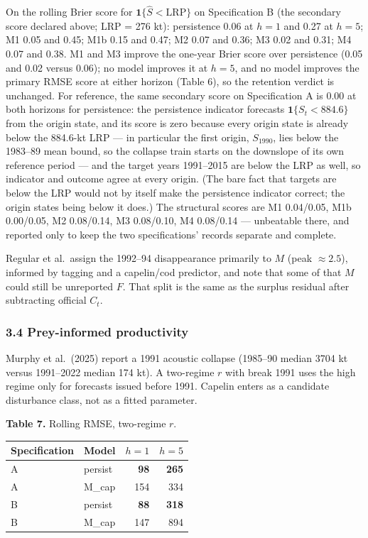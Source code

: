\documentclass[11pt]{article}
\begin{document}
On the rolling Brier score for \(\mathbf{1}\{\hat S<\mathrm{LRP}\}\) on
Specification B (the secondary score declared above; LRP = 276 kt):
persistence 0.06 at \(h{=}1\) and 0.27 at \(h{=}5\); M1 0.05 and 0.45;
M1b 0.15 and 0.47; M2 0.07 and 0.36; M3 0.02 and 0.31; M4 0.07 and 0.38.
M1 and M3 improve the one-year Brier score over persistence (0.05 and
0.02 versus 0.06); no model improves it at \(h{=}5\), and no model
improves the primary RMSE score at either horizon (Table 6), so the
retention verdict is unchanged. For reference, the same secondary score
on Specification A is 0.00 at both horizons for persistence: the
persistence indicator forecasts \(\mathbf{1}\{S_t<884.6\}\) from the
origin state, and its score is zero because every origin state is
already below the 884.6-kt LRP --- in particular the first origin,
\(S_{1990}\), lies below the 1983--89 mean bound, so the collapse train
starts on the downslope of its own reference period --- and the target
years 1991--2015 are below the LRP as well, so indicator and outcome
agree at every origin. (The bare fact that targets are below the LRP
would not by itself make the persistence indicator correct; the origin
states being below it does.) The structural scores are M1 0.04/0.05, M1b
0.00/0.05, M2 0.08/0.14, M3 0.08/0.10, M4 0.08/0.14 --- unbeatable
there, and reported only to keep the two specifications' records
separate and complete.

Regular et al.~assign the 1992--94 disappearance primarily to \(M\)
(peak \(\approx 2.5\)), informed by tagging and a capelin/cod predictor,
and note that some of that \(M\) could still be unreported \(F\). That
split is the same as the surplus residual after subtracting official
\(C_t\).

\subsubsection{3.4 Prey-informed
productivity}\label{prey-informed-productivity}

Murphy et al.~(2025) report a 1991 acoustic collapse (1985--90 median
3704 kt versus 1991--2022 median 174 kt). A two-regime \(r\) with break
1991 uses the high regime only for forecasts issued before 1991. Capelin
enters as a candidate disturbance class, not as a fitted parameter.

\textbf{Table 7.} Rolling RMSE, two-regime \(r\).

\begin{longtable}[]{@{}llrr@{}}
\toprule\noalign{}
Specification & Model & \(h=1\) & \(h=5\) \\
\midrule\noalign{}
\endhead
\bottomrule\noalign{}
\endlastfoot
A & persist & \textbf{98} & \textbf{265} \\
A & M\_cap & 154 & 334 \\
B & persist & \textbf{88} & \textbf{318} \\
B & M\_cap & 147 & 894 \\
\end{longtable}
\end{document}
